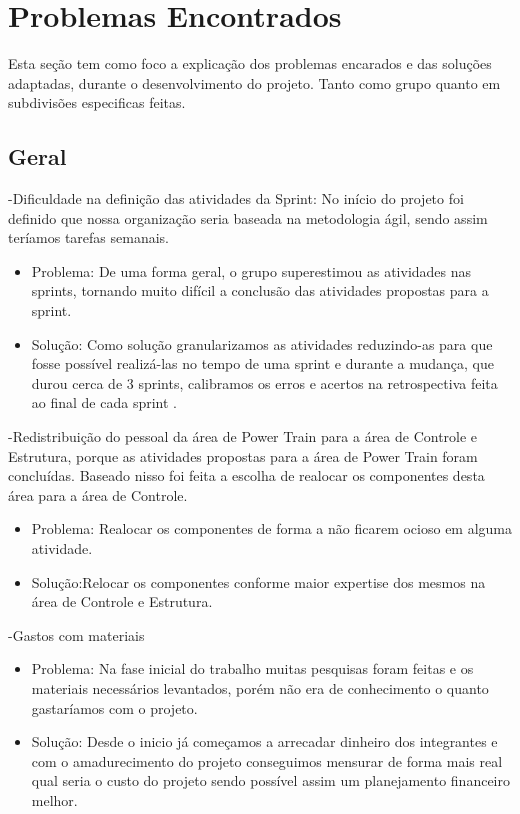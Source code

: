 \chapter[Problemas Encontrados]{Problemas Encontrados}

Esta seção tem como foco a explicação dos problemas encarados e das soluções adaptadas, durante o desenvolvimento do projeto. Tanto como grupo quanto em subdivisões especificas feitas.

 \section{Geral}

-Dificuldade na definição das atividades da Sprint: No início do projeto foi definido que nossa organização seria baseada na metodologia ágil, sendo assim teríamos tarefas semanais.
    \begin{itemize}
      \item Problema: De uma forma geral, o grupo superestimou as atividades nas sprints, tornando muito difícil a conclusão das atividades propostas para a sprint.
	  \item Solução: Como solução granularizamos as atividades reduzindo-as para que fosse possível realizá-las no tempo de uma sprint e durante a mudança, que durou cerca de 3 sprints, calibramos os erros e acertos na retrospectiva feita ao final de cada sprint
.

    \end{itemize}

-Redistribuição do pessoal da área de Power Train para a área de Controle e Estrutura, porque as atividades propostas para a área de Power Train foram concluídas. Baseado nisso foi feita a escolha de realocar os componentes desta área para a área de Controle.
    \begin{itemize}
      \item Problema: Realocar os componentes de forma a não ficarem ocioso em alguma atividade.
	  \item Solução:Relocar os componentes conforme maior expertise dos mesmos na área de Controle e Estrutura.

    \end{itemize}

-Gastos com materiais
    \begin{itemize}
  \item Problema: Na fase inicial do trabalho muitas pesquisas foram feitas e os materiais necessários levantados, porém não era de conhecimento o quanto gastaríamos com o projeto.
  \item Solução: Desde o inicio já começamos a arrecadar dinheiro dos integrantes e com o amadurecimento do projeto conseguimos mensurar de forma mais real qual seria o custo do projeto sendo possível assim um planejamento financeiro melhor.

    \end{itemize}

